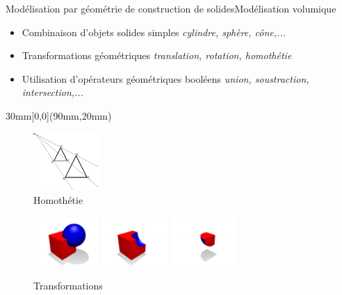 \documentclass{beamer}
\begin{document}
\begin{frame}[c]{Modélisation par géométrie de construction de solides}{Modélisation volumique}

\begin{itemize}
\item Combinaison d'objets solides simples
\newline \textit{cylindre, sphère, cône,...}
\end{itemize}
\newline
\begin{itemize}
\item Transformations géométriques
\newline \textit{translation, rotation, homothétie}
\end{itemize}
\newline
\begin{itemize}
\item Utilisation d'opérateurs géométriques booléens
\newline \textit{union, soustraction, intersection,...}
\end{itemize}

  \begin{textblock*}{30mm}[0,0](90mm,20mm)
    \begin{figure}
    \includegraphics[width=25mm]{geo/homothetie.png}
    \caption{Homothétie}
    \end{figure}
  \end{textblock*}

\begin{center}


\begin{figure}
\includegraphics[width=25mm]{geo/geoUnion.PNG}
\hfill
\includegraphics[width=25mm]{geo/geoDifference.PNG}
\hfill
\includegraphics[width=25mm]{geo/geoIntersection.PNG}
\caption{Transformations}
\end{figure}


\end{center}
\end{frame}
\end{document}
